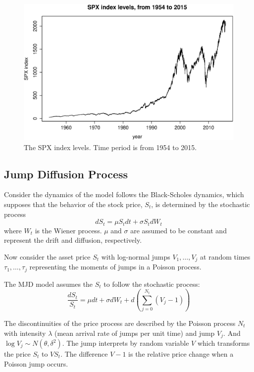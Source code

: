 \documentclass[11pt,reqno,final]{amsart}
\begin{document}
\begin{figure}
  \centering
  \includegraphics[scale=0.6]{plot_spx.eps}
  \caption{The SPX index levels. Time period is from 1954 to 2015.}\label{plot_spx}
\end{figure}

\subsection{Jump Diffusion Process}
Consider the dynamics of the model follows the Black-Scholes dynamics, which supposes
that the behavior of the stock price, $S_t$, is determined by the stochastic process
$$
dS_t = \mu S_t dt + \sigma S_t dW_t
$$
where $W_t$ is the Wiener process. $\mu$ and $\sigma$ are assumed to be constant and
represent the drift and diffusion, respectively.

Now consider the asset price $S_t$ with log-normal jumps $V_1, \ldots, V_j$ at random times
$\tau_1, \ldots, \tau_j$ representing the moments of jumps in a Poisson process.

The MJD model assumes the $S_t$ to follow the stochastic process:
\begin{equation} \label{jump_process}
\frac{dS_t}{S_t} = \mu dt + \sigma dW_t + d\left( \sum_{j=0}^{N_t}(V_j -1) \right)
\end{equation}

The discontinuities of the price process are described by the Poisson process $N_t$
with intensity $\lambda$ (mean arrival rate of jumps per unit time) and jump $V_j$.
And $\log V_j \sim N(\theta, \delta^2)$. The jump interprets by random variable $V$ which
transforms the price $S_t$ to $VS_t$. The difference $V-1$ is the relative price change when
a Poisson jump occurs.
\end{document}
